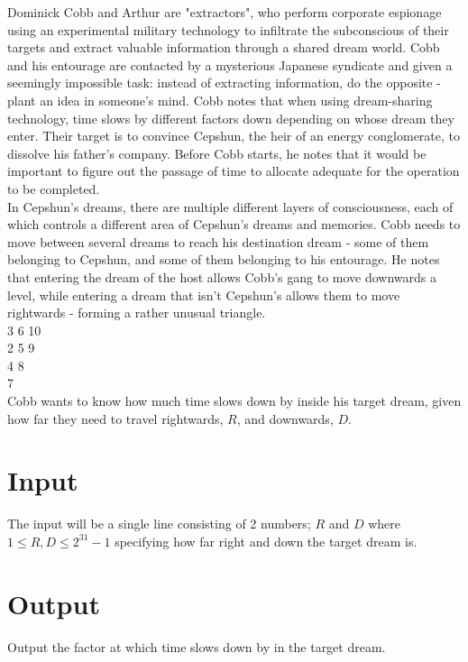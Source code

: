 
\noindent Dominick Cobb and Arthur are "extractors", who perform corporate espionage using an experimental military technology to infiltrate the subconscious of their targets and extract valuable information through a shared dream world. Cobb and his entourage are contacted by a mysterious Japanese syndicate and given a seemingly impossible task: instead of extracting information, do the opposite - plant an idea in someone's mind. Cobb notes that when using dream-sharing technology, time slows by different factors down depending on whose dream they enter. Their target is to convince Cepshun, the heir of an energy conglomerate, to dissolve his father's company. Before Cobb starts, he notes that it would be important to figure out the passage of time to allocate adequate for the operation to be completed.\\

\noindent In Cepshun's dreams, there are multiple different layers of consciousness, each of which controls a different area of Cepshun's dreams and memories. Cobb needs to move between several dreams to reach his destination dream - some of them belonging to Cepshun, and some of them belonging to his entourage. He notes that entering the dream of the host allows Cobb's gang to move downwards a level, while entering a dream that isn't Cepshun's allows them to move rightwards - forming a rather unusual triangle. \\

 3 6 10\\
 2 5 9\\
 4 8\\
 7\\

\noindent Cobb wants to know how much time slows down by inside his target dream, given how far they need to travel rightwards, $R$, and downwards, $D$. \\

\section*{Input}
The input will be a single line consisting of 2 numbers; $R$ and $D$ where $1 \leq R, D \leq 2^{31} - 1$ specifying how far right and down the target dream is.

\section*{Output}
Output the factor at which time slows down by in the target dream.